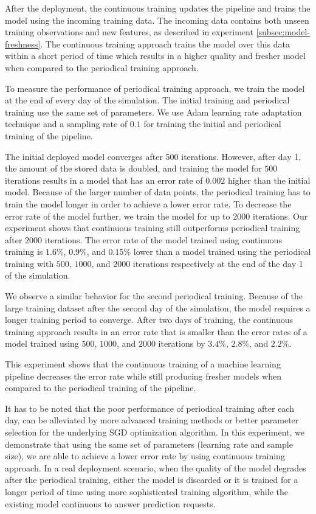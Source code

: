 After the deployment, the continuous training updates the pipeline and trains the model using the incoming training data.
The incoming data contains both unseen training observations and new features, as described in experiment \ref{subsec:model-freshness}.
The continuous training approach trains the model over this data within a short period of time which results in a higher quality and fresher model when compared to the periodical training approach.

To measure the performance of periodical training approach, we train the model at the end of every day of the simulation.
The initial training and periodical training use the same set of parameters.
We use Adam learning rate adaptation technique and a sampling rate of $0.1$ for training the initial and periodical training of the pipeline.

The initial deployed model converges after 500 iterations.
However, after day 1, the amount of the stored data is doubled, and training the model for $500$ iterations results in a model that has an error rate of $0.002$ higher than the initial model.
Because of the larger number of data points, the periodical training has to train the model longer in order to achieve a lower error rate.
To decrease the error rate of the model further, we train the model for up to $2000$ iterations.
Our experiment shows that continuous training still outperforms periodical training after $2000$ iterations.
The error rate of the model trained using continuous training is $1.6\%$, $0.9\%$, and $0.15\% $ lower than a model trained using the periodical training with $500$, $1000$, and $2000$ iterations respectively at the end of the day 1 of the simulation.

We observe a similar behavior for the second periodical training.
Because of the large training dataset after the second day of the simulation, the model requires a longer training period to converge.
After two days of training, the continuous training approach results in an error rate that is smaller than the error rates of a model trained using $500$, $1000$, and $2000$ iterations by $3.4\%$, $2.8\%$, and $2.2\%$.

This experiment shows that the continuous training of a machine learning pipeline decreases the error rate while still producing fresher models when compared to the periodical training of the pipeline.

It has to be noted that the poor performance of periodical training after each day, can be alleviated by more advanced training methods or better parameter selection for the underlying SGD optimization algorithm.
In this experiment, we demonstrate that using the same set of parameters (learning rate and sample size), we are able to achieve a lower error rate by using continuous training approach.
In a real deployment scenario, when the quality of the model degrades after the periodical training, either the model is discarded or it is trained for a longer period of time using more sophisticated training algorithm, while the existing model continuous to answer prediction requests.

